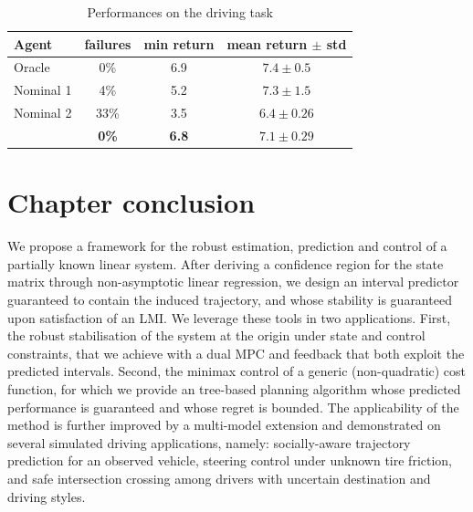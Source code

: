 \begin{table}[t]
	\caption{Performances on the driving task}
	\label{tab:driving}
	\centering
	\begin{tabular}{lccc}
		\toprule
		Agent &
		failures &
		min return &
		mean return $\pm$ std  \\
		\midrule
		Oracle & 0\% & {6.9} & $7.4 \pm 0.5$ \\
		\midrule
		{Nominal 1} & 4\% & {5.2} & $\mathbf{7.3} \pm 1.5$ \\
		{Nominal 2} & 33\% & {3.5} & $6.4 \pm 0.26$ \\
		\Cref{alg:full} & \textbf{0\%} & \textbf{6.8} & $7.1 \pm 0.29$ \\
		\bottomrule
	\end{tabular}
\end{table}

\section*{Chapter conclusion}

We propose a framework for the robust estimation, prediction and control of a partially known linear system. After deriving a confidence region for the state matrix through non-asymptotic linear regression, we design an interval predictor guaranteed to contain the induced trajectory, and whose stability is guaranteed upon satisfaction of an \gls{LMI}. We leverage these tools in two applications. First, the robust stabilisation of the system at the origin under state and control constraints, that we achieve with a dual \gls{MPC} and feedback that both exploit the predicted intervals. Second, the minimax control of a generic (non-quadratic) cost function, for which we provide an tree-based planning algorithm whose predicted performance is guaranteed and whose regret is bounded. The applicability of the method is further improved by a multi-model extension and demonstrated on several simulated driving applications, namely: socially-aware trajectory prediction for an observed vehicle, steering control under unknown tire friction, and safe intersection crossing among drivers with uncertain destination and driving styles.

